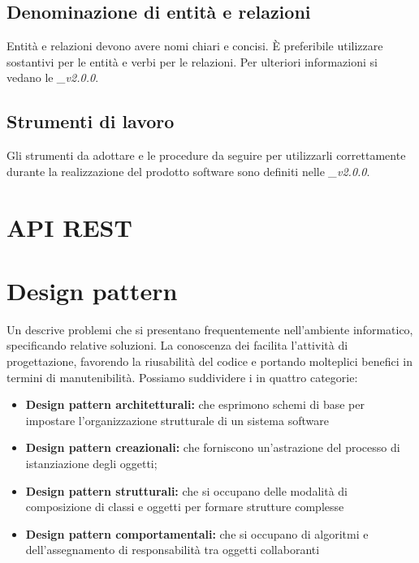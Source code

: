 \documentclass[12pt,a4paper]{article}
\begin{document}

\subsection{Denominazione di entità e relazioni}
Entità e relazioni devono avere nomi chiari e concisi. È preferibile utilizzare sostantivi per le entità e verbi per le relazioni. Per ulteriori informazioni si vedano le \textit{\NdP\_v2.0.0}.

\subsection{Strumenti di lavoro}
Gli strumenti da adottare e le procedure da seguire per utilizzarli correttamente durante la realizzazione  del prodotto software sono definiti nelle \textit{\NdP\_v2.0.0}.

\newpage

\section{API REST}


\newpage


\newpage



\newpage
\section{Design pattern}
Un  descrive problemi che si presentano frequentemente nell'ambiente informatico, specificando relative soluzioni. La conoscenza dei  facilita l’attività di progettazione, favorendo la riusabilità del codice e portando molteplici benefici in termini di manutenibilità. Possiamo suddividere i  in quattro categorie:

\begin{itemize}
	\item \textbf{Design pattern architetturali:} che esprimono schemi di base per impostare l’organizzazione strutturale di un sistema software
	\item \textbf{Design pattern creazionali:} che forniscono un’astrazione del processo di istanziazione degli oggetti;
	\item \textbf{Design pattern strutturali:} che si occupano delle modalità di composizione di classi e oggetti per formare strutture complesse
	\item \textbf{Design pattern comportamentali:} che si occupano di algoritmi e dell’assegnamento di responsabilità tra oggetti collaboranti
\end{itemize}
\end{document}
